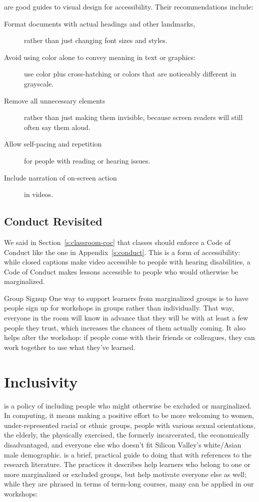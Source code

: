\cite{Coom2012,Burg2015} are good guides to visual design for
accessibility. Their recommendations include:

\begin{description}
\item[Format documents with actual headings and other landmarks,]
rather than just changing font sizes and styles.
\item[Avoid using color alone to convey meaning in text or graphics:]
use color plus cross-hatching or colors that are noticeably
different in grayscale.
\item[Remove all unnecessary elements]
rather than just making them invisible, because screen readers will
still often say them aloud.
\item[Allow self-pacing and repetition]
for people with reading or hearing issues.
\item[Include narration of on-screen action]
in videos.
\end{description}

\subsection{Conduct Revisited}\label{conduct-revisited}

We said in Section~\ref{s:classroom-coc} that classes should
enforce a Code of Conduct like the one in Appendix~\ref{s:conduct}. This
is a form of accessibility: while closed captions make video accessible
to people with hearing disabilities, a Code of Conduct makes lessons
accessible to people who would otherwise be marginalized.

\begin{aside}{Group Signup}
  One way to support learners from marginalized groups is to have people
  sign up for workshops in groups rather than individually. That way,
  everyone in the room will know in advance that they will be with at
  least a few people they trust, which increases the chances of them
  actually coming. It also helps after the workshop: if people come with
  their friends or colleagues, they can work together to use what
  they've learned.
\end{aside}

\section{Inclusivity}\label{s:motivation-inclusivity}

 is a policy of including people
who might otherwise be excluded or marginalized. In computing, it means
making a positive effort to be more welcoming to women,
under-represented racial or ethnic groups, people with various sexual
orientations, the elderly, the physically exercised, the formerly
incarcerated, the economically disadvantaged, and everyone else who
doesn't fit Silicon Valley's white/Asian male demographic.
\cite{Lee2017} is a brief, practical guide to doing that with
references to the research literature. The practices it describes help
learners who belong to one or more marginalized or excluded groups, but
help motivate everyone else as well; while they are phrased in terms of
term-long courses, many can be applied in our workshops:

